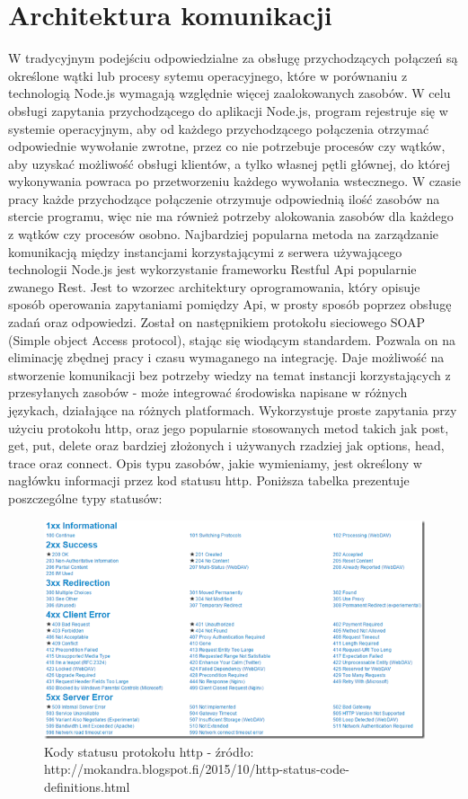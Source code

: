 \documentclass[12pt]{report}
\begin{document}
\section{Architektura komunikacji}
W tradycyjnym podejściu odpowiedzialne za obsługę przychodzących połączeń są określone wątki lub procesy sytemu operacyjnego, które w porównaniu z technologią Node.js wymagają względnie więcej zaalokowanych zasobów. 
W celu obsługi zapytania przychodzącego do aplikacji Node.js, program rejestruje się w systemie operacyjnym, aby od każdego przychodzącego połączenia otrzymać odpowiednie wywołanie zwrotne, przez co nie potrzebuje procesów czy wątków, aby uzyskać możliwość obsługi klientów, a tylko własnej pętli głównej, do której wykonywania powraca po przetworzeniu każdego wywołania wstecznego. 
W czasie pracy każde przychodzące połączenie otrzymuje odpowiednią ilość zasobów na stercie programu, więc nie ma również potrzeby alokowania zasobów dla każdego z wątków czy procesów osobno. 
Najbardziej popularna metoda na zarządzanie komunikacją między instancjami korzystającymi z serwera używającego technologii Node.js jest wykorzystanie frameworku Restful Api popularnie zwanego Rest. 
Jest to wzorzec architektury oprogramowania, który opisuje sposób operowania zapytaniami pomiędzy Api, w prosty sposób poprzez obsługę zadań oraz odpowiedzi. 
Został on następnikiem protokołu sieciowego SOAP (Simple object Access protocol), stając się wiodącym standardem. 
Pozwala on na eliminację zbędnej pracy i czasu wymaganego na integrację. 
Daje możliwość na stworzenie komunikacji bez potrzeby wiedzy na temat instancji korzystających z przesyłanych zasobów - może integrować środowiska napisane w różnych językach, działające na różnych platformach. 
Wykorzystuje proste zapytania przy użyciu protokołu http, oraz jego popularnie stosowanych metod takich jak post, get, put, delete oraz bardziej złożonych i używanych rzadziej jak options, head, trace oraz connect. 
Opis typu zasobów, jakie wymieniamy, jest określony w nagłówku informacji przez kod statusu http. 
Poniższa tabelka prezentuje poszczególne typy statusów:
\newpage
\begin{figure}[!hb]
\centering
\includegraphics[width=\textwidth,height=\textheight,keepaspectratio]{statuses.png} 
\caption{Kody statusu protokołu http - źródło: http://mokandra.blogspot.fi/2015/10/http-status-code-definitions.html}
\end{figure}
\end{document}
